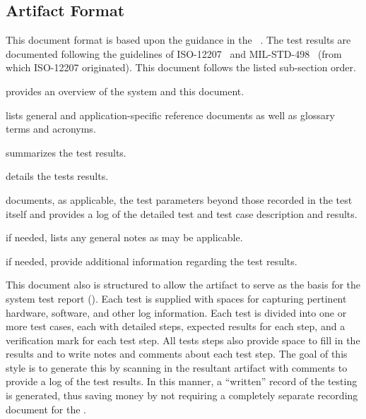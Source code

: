 
\subsection{Artifact Format}
\label{loc:DocOverview_ArtifactFormat}

This document format is based upon the guidance in the \STR{} \DID~\cite{ref__STR_DID}.
The test results are documented following the guidelines of ISO-12207~\cite{ref__ISO_12207} and MIL-STD-498~\cite{ref__MIL_STD_498} (from which ISO-12207 originated).
This document follows the listed \STR sub-section order.
\begin{description}[itemindent=5pt,topsep=0pt,itemsep=0pt,partopsep=0pt, parsep=0pt]
	\item[Section 1] provides an overview of the system and this document.
	\item[Section 2] lists general and application-specific reference documents as well as glossary terms and acronyms. 
	\item[Section 3] summarizes the test results.
	\item[Section 4] details the tests results. 
	\item[Section 5] documents, as applicable, the test parameters beyond those recorded in the test itself and provides a log of the detailed test and test case description and results.
	\item[Section 6] if needed, lists any general notes as may be applicable.
	\item[Appendices] if needed, provide additional information regarding the test results.
\end{description}


This document also is structured to allow the \STS artifact to serve as the basis for the system test report (\STR).
Each test is supplied with spaces for capturing pertinent hardware, software, and other log information.
Each test is divided into one or more test cases, each with detailed steps, expected results for each step, and a verification mark for each test step.
All tests steps also provide space to fill in the results and to write notes and comments about each test step.
The goal of this style is to generate this \STR by scanning in the resultant \STS artifact with comments to provide a log of the test results.
In this manner, a ``written'' record of the testing is generated, thus saving money by not requiring a completely separate recording document for the \STR.


